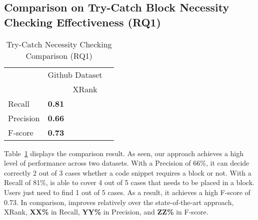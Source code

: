 \subsection{Comparison on Try-Catch Block Necessity Checking Effectiveness (RQ1)}
\label{sec:rq1}

\begin{table}[t]%
  \caption{Try-Catch Necessity Checking Comparison (RQ1)}
  \vspace{-12pt}
  \small
	\begin{center}
		\renewcommand{\arraystretch}{1}
		\begin{tabular}{|p{1.5cm}<{\centering}|p{1.25cm}<{\centering}|p{1.25cm}<{\centering}|p{1.25cm}<{\centering}}
		  \hline
			\multirow{2}{*}{} & \multicolumn{2}{c|}{Github Dataset} \\
			\cline{2-3}
			  & \tool  & XRank~\cite{xrank-fse20} \\
			\hline
			Recall    & \textbf{0.81} & \\
			Precision & \textbf{0.66} & \\
			F-score   & \textbf{0.73} & \\
			\hline
		\end{tabular}
		\label{tab:xblock}
	\end{center}
\end{table}


Table~\ref{tab:xblock} displays the comparison result. As seen, our
approach achieves a high level of performance across two
datasets. With a Precision of 66\%, it can decide correctly 2 out of 3
cases whether a code snippet requires a  block or
not. With a Recall of 81\%, {\tool} is able to cover 4 out of 5 cases
that needs to be placed in a  block. Users just need
to find 1 out of 5 cases. As a result, it achieves a high F-score of
0.73.
In comparison, {\tool} improves relatively over the state-of-the-art
approach, XRank, {\bf XX\%} in Recall, {\bf YY\%} in Precision, and
{\bf ZZ\%} in F-score.


